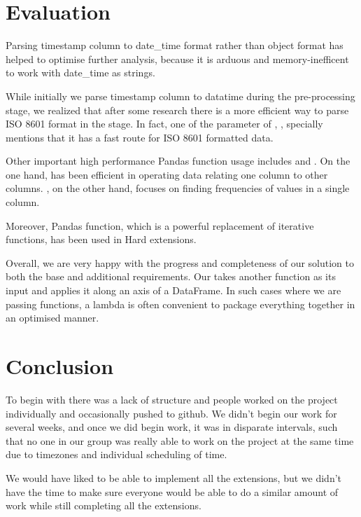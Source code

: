 \documentclass[12pt,a4paper,final]{article}
\begin{document}
\section*{Evaluation}
Parsing timestamp column to date\_time format rather than object format has helped to optimise further analysis, because it is arduous and memory-inefficent to work with date\_time as strings.

While initially we parse timestamp column to datatime during the pre-processing stage, we realized that after some research there is a more efficient way to parse ISO 8601 format in the  stage.
In fact, one of the parameter of , , specially mentions that it has a fast route for ISO 8601 formatted data.

Other important high performance Pandas function usage includes  and . On the one hand,  has been efficient in operating data relating one column to other columns.
, on the other hand, focuses on finding frequencies of values in a single column.

Moreover, Pandas  function, which is a powerful replacement of iterative functions, has been used in Hard extensions.

Overall, we are very happy with the progress and completeness of our solution to both the base and additional requirements. Our  takes another function as its input and applies it along an axis of a DataFrame.
In such cases where we are passing functions, a lambda is often convenient to package everything together in an optimised manner.

\section*{Conclusion}

To begin with there was a lack of structure and people worked on the project individually and occasionally pushed to github. We didn't begin our work for several weeks, and once we did begin work, it was in disparate intervals, such that no one in our group was really able to work on the project at the same time due to timezones and individual scheduling of time.

We would have liked to be able to implement all the extensions, but we didn't have the time to make sure everyone would be able to do a similar amount of work while still completing all the extensions.
\end{document}
